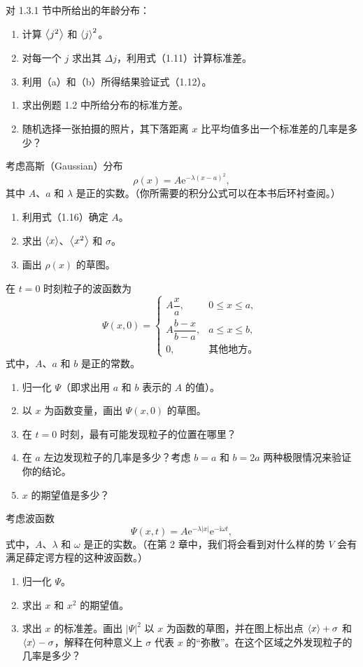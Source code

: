 
对 1.3.1 节中所给出的年龄分布：
\begin{enumerate}
\item 计算 $\left\langle j^2\right\rangle$ 和 $\left\langle j\right\rangle^2$。
\item 对每一个 $j$ 求出其 $\Delta j$，利用式（1.11）计算标准差。
\item 利用（a）和（b）所得结果验证式（1.12）。
\end{enumerate}
\vfill

\begin{enumerate}
\item 求出例题 1.2 中所给分布的标准方差。
\item 随机选择一张拍摄的照片，其下落距离 $x$ 比平均值多出一个标准差的几率是多少？
\end{enumerate}
\vfill

考虑高斯（Gaussian）分布
\[
\rho(x)=A\mathrm{e}^{-\lambda(x-a)^2},
\]
其中 $A$、$a$ 和 $\lambda$ 是正的实数。（你所需要的积分公式可以在本书后环衬查阅。）
\begin{enumerate}
\item 利用式（1.16）确定 $A$。
\item 求出 $\left\langle x\right\rangle$、$\left\langle x^2\right\rangle$ 和 $\sigma$。
\item 画出 $\rho(x)$ 的草图。
\end{enumerate}
\vfill

在 $t=0$ 时刻粒子的波函数为
\[
\Psi(x,0)=\begin{cases}
A\dfrac{x}{a},&0\leq x\leq a,\\[4pt]
A\dfrac{b-x}{b-a},&a\leq x\leq b,\\[4pt]
0,&\text{其他地方。}
\end{cases}
\]
式中，$A$、$a$ 和 $b$ 是正的常数。
\begin{enumerate}
\item 归一化 $\Psi$（即求出用 $a$ 和 $b$ 表示的 $A$ 的值）。
\item 以 $x$ 为函数变量，画出 $\Psi(x,0)$ 的草图。
\item 在 $t=0$ 时刻，最有可能发现粒子的位置在哪里？
\item 在 $a$ 左边发现粒子的几率是多少？考虑 $b=a$ 和 $b=2a$ 两种极限情况来验证你的结论。
\item $x$ 的期望值是多少？
\end{enumerate}
\vfill

考虑波函数
\[
\Psi(x,t)=A\mathrm{e}^{-\lambda|x|}\mathrm{e}^{-\mathrm{i}\omega t},
\]
式中，$A$、$\lambda$ 和 $\omega$ 是正的实数。（在第 2 章中，我们将会看到对什么样的势 $V$ 会有满足薛定谔方程的这种波函数。）
\begin{enumerate}
\item 归一化 $\Psi$。
\item 求出 $x$ 和 $x^2$ 的期望值。
\item 求出 $x$ 的标准差。画出 $|\Psi|^2$ 以 $x$ 为函数的草图，并在图上标出点 $\left\langle x\right\rangle+\sigma$ 和 $\left\langle x\right\rangle-\sigma$，解释在何种意义上 $\sigma$ 代表 $x$ 的“弥散”。在这个区域之外发现粒子的几率是多少？
\end{enumerate}
\vfill

